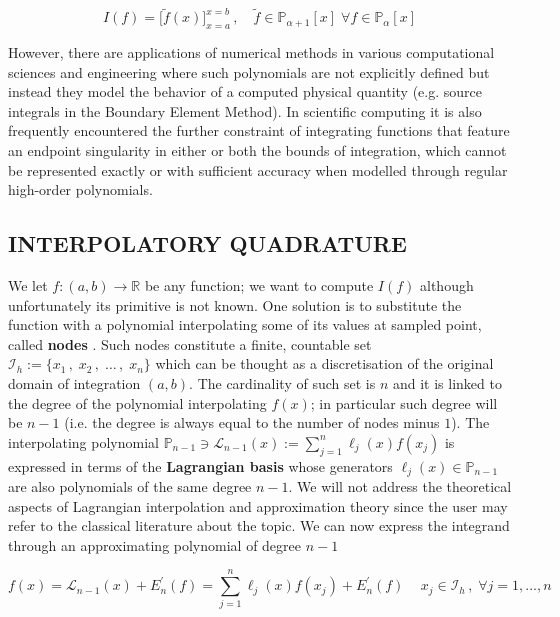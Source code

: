 \documentclass[a4paper, twosided]{book}
\begin{document}
\begin{equation}\label{eq1.2}
    I(f) = \Big[\tilde{f}(x)\Big]_{x=a}^{x=b}\,,\quad\tilde{f}\in\mathbb{P}_{\alpha+1}[x]\;\forall f\in\mathbb{P}_{\alpha}[x]
\end{equation}

\noindent
However, there are applications of numerical methods in various computational sciences and engineering where such polynomials are not explicitly defined but instead they model the behavior of a computed physical quantity (e.g. source integrals in the Boundary Element Method). In scientific computing it is also frequently encountered the further constraint of integrating functions that feature an endpoint singularity in either or both the bounds of integration, which cannot be represented exactly or with sufficient accuracy when modelled through regular high-order polynomials.

\subsection[Interpolatory quadrature]{\changefont INTERPOLATORY QUADRATURE}\label{SubSec1.2.1}

We let $f:(a,b)\to\mathbb{R}$ be any function; we want to compute $I(f)$ although unfortunately its primitive is not known. One solution is to substitute the function with a polynomial interpolating some of its values at sampled point, called \color{poliDarkBlue} \textbf{nodes} \color{black}. Such nodes constitute a finite, countable set $\mathcal{I}_h:=\{x_1\,,\;x_2\,,\;\dots\,,\;x_{n}\}$ which can be thought as a discretisation of the original domain of integration $(a,b)$. The cardinality of such set is  $n$ and it is linked to the degree of the polynomial interpolating $f(x)$; in particular such degree will be $n-1$ (i.e. the degree is always equal to the number of nodes minus $1$). The interpolating polynomial $\mathbb{P}_{n-1}\ni\mathcal{L}_{n-1}(x):=\sum_{j=1}^{n}\ell_j(x)f(x_j)$ is expressed in terms of the \color{poliDarkBlue} \textbf{Lagrangian basis} \color{black} whose generators $\ell_j(x)\in\mathbb{P}_{n-1}$ are also polynomials of the same degree $n-1$. We will not address the theoretical aspects of Lagrangian interpolation and approximation theory since the user may refer to the classical literature about the topic. We can now express the integrand through an approximating polynomial of degree $n-1$

\begin{equation}\label{eq1.3}
    f(x) = \mathcal{L}_{n-1}(x) + E^{'}_n(f) = \sum_{j=1}^{n}\ell_j(x)f(x_j) + E^{'}_n(f)\,\quad x_j\in\mathcal{I}_h\,,\;\forall j=1,...,n
\end{equation}
\end{document}
